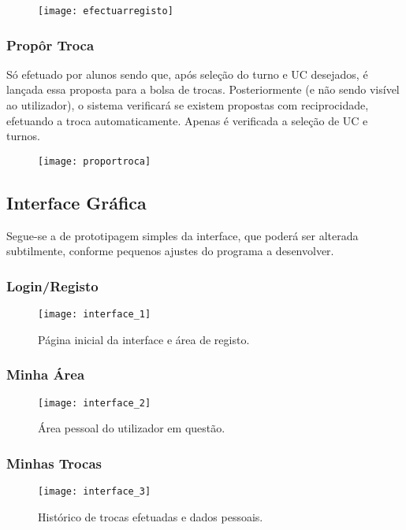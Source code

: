 \documentclass[a4paper]{article}
\begin{document}
\begin{figure}[H]
\centering
\texttt{[image: efectuarregisto]}
\caption{}
\label{fig:13}
\end{figure}


\subsubsection{Propôr Troca}
\hspace{3mm}Só efetuado por alunos sendo que, após seleção do turno e UC desejados, é lançada essa proposta para a bolsa de trocas. Posteriormente (e não sendo visível ao utilizador), o sistema verificará se existem propostas com reciprocidade, efetuando a troca automaticamente. Apenas é verificada a seleção de UC e turnos.

\begin{figure}[H]
\centering
\texttt{[image: proportroca]}
\caption{}
\label{fig:14}
\end{figure}



\subsection{Interface Gráfica}
\hspace{3mm} Segue-se a de prototipagem simples da interface, que poderá ser alterada subtilmente, conforme pequenos ajustes do programa a desenvolver. 


\subsubsection{Login/Registo}
\begin{figure}[H]
\centering
\texttt{[image: interface\_1]}
\caption{Página inicial da interface e área de registo.}
\label{fig:15}
\end{figure}



\subsubsection{Minha Área}
\begin{figure}[H]
\centering
\texttt{[image: interface\_2]}
\caption{Área pessoal do utilizador em questão.}
\label{fig:16}
\end{figure}


\subsubsection{Minhas Trocas}
\begin{figure}[H]
\centering
\texttt{[image: interface\_3]}
\caption{Histórico de trocas efetuadas e dados pessoais.}
\label{fig:17}
\end{figure}
\end{document}
